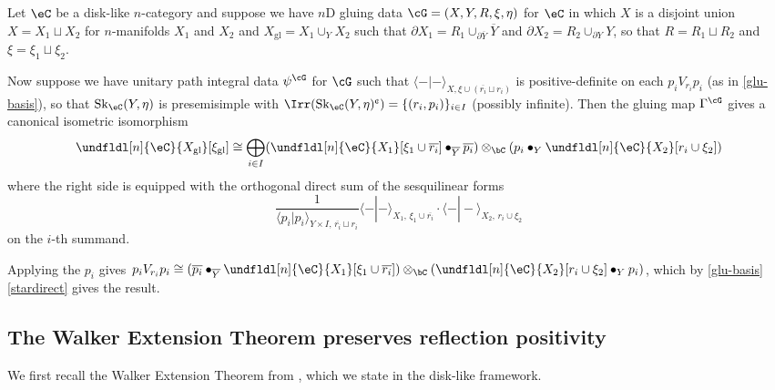 \documentclass[12pt,reqno]{amsart}
\newcommand{\glu}{\mathrm{gl}}
\newcommand{\Sk}{\mathrm{Sk}}
\newcommand{\C}{\eC}
\newcommand{\blt}{\bullet}
\newcommand{\fcj}[1]{\overline{#1}}
\newcommand{\orev}{\overline}
\newcommand{\bkt}[2]{\langle #1|#2 \rangle}
\newcommand{\cent}{\textup{\textcent}}
\renewcommand{\amalg}{\sqcup}
\begin{document}
\begin{corollary}
\label{stadard-skthy}
Let $\C$ be a disk-like $n$-category and suppose we have $n$D gluing data $\cG=(X, Y, R, \xi, \eta)$ for $\C$ in which $X$ is a disjoint union $X = X_1 \amalg X_2$ for $n$-manifolds $X_1$ and $X_2$ and $X_\glu=X_1\cup_Y X_2$ such that $\partial X_1 = R_1 \cup_{\partial \orev Y} \orev{Y}$ and $\partial X_2 = R_2 \cup_{\partial Y} Y$, so that $R = R_1 \amalg R_2$ and $\xi = \xi_1 \amalg \xi_2$. 

Now suppose we have unitary path integral data $\psi^\cG$ for $\cG$ such that $\bkt--_{X,\xi\cup(\fcj{r_i}\amalg r_i)}$ is positive-definite on each $p_iV_{r_i}p_i$ (as in \cref{glu-basis}), so that $\Sk_\C(Y,\eta)$ is presemisimple with $\Irr(\Sk_\C(Y,\eta)^\cent)= \{(r_i,p_i)\}_{i\in I}$ (possibly infinite). Then the gluing map $\Gamma^\cG$ gives a canonical isometric isomorphism
\[
\undfldl[n]{\C}{X_{\glu}}[ \xi_{\glu}] \cong
\bigoplus_{i \in I}
(\undfldl[n]{\C}{X_1}[ \xi_1 \cup \fcj{r_i}]\blt_{\orev Y}\fcj{p_i})
\otimes_\bC
(p_i\blt_Y \undfldl[n]{\C}{X_2}[ r_i\cup \xi_2])
\]
where the right side is equipped with the orthogonal direct sum of the sesquilinear forms
\[
  \frac{1}{\bkt{p_i}{p_i}_{Y\times I,\,\fcj{r_i}\amalg r_i}}
  \bkt{-}{-}_{X_1,\,\xi_1\cup\fcj{r_i}}
  \cdot
  \bkt{-}{-}_{X_2,\,r_i\cup\xi_2}
\]
on the $i$-th summand.
\end{corollary}

\begin{pf}
Applying the $p_i$ gives $p_i V_{r_i} p_i \cong (\fcj{p_i} \blt_{\orev Y} \undfldl[n]{\C}{X_1}[ \xi_1 \cup \fcj{r_i}]) \otimes_\bC (\undfldl[n]{\C}{X_2}[r_i \cup \xi_2] \blt_Y p_i)$, which by \cref{glu-basis}\ref{stardirect} gives the result.
\end{pf}

\subsection{The Walker Extension Theorem preserves reflection positivity}

We first recall the Walker Extension Theorem from \cite{W06,W21}, which we state in the disk-like framework.
\end{document}
